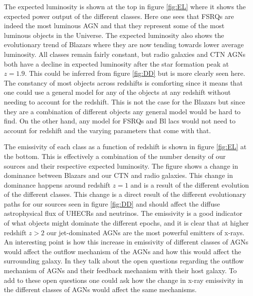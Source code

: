 The expected luminosity is shown at the top in figure \ref*{fig:EL} where it shows the expected power output of the different classes. Here one sees that FSRQs are indeed the most luminous AGN and 
that they represent some of the most luminous objects in the Universe.
The expected luminosity also shows the evolutionary trend of Blazars where they are now tending towards lower average luminosity. 
All classes remain fairly constant, but radio galaxies and CTN AGNs both have a decline in expected luminosity after the star formation peak at $z=1.9$. This could be inferred from figure \ref*{fig:DD} but is more clearly seen here.
The constancy of most objects across redshifts is comforting since it means that one could use a general model for any of the objects at any redshift without needing to account for the redshift. 
This is not the case for the Blazars but since they are a combination of different objects any general model would be hard to find. On the other hand, any model for FSRQs and Bl lacs would not need to account for redshift and the varying parameters that come with that. 

The emissivity of each class as a function of redshift is shown in figure \ref*{fig:EL} at the bottom. This is effectively a combination of the number density of our sources and their respective expected luminosity. 
The figure shows a change in dominance between Blazars and our CTN and radio galaxies. This change in dominance happens around redshift $z=1$ and is a result of the different evolution of the different classes.
This change is a direct result of the different evolutionary paths for our sources seen in figure \ref*{fig:DD} and should affect the diffuse astrophysical flux of UHECRs and neutrinos. 
The emissivity is a good indicator of what objects might dominate the different epochs, and it is clear that at higher redshift $z>2$ our jet-dominated AGNs are the most powerful emitters of x-rays. 
An interesting point is how this increase in emissivity of different classes of AGNs would affect the outflow mechanism of the AGNs and how this would affect the surrounding galaxy. In \cite{Laha_2021}
they talk about the open questions regarding the outflow mechanism of AGNs and their feedback mechanism with their host galaxy. To add to these open questions one could ask how the change in x-ray emissivity in the different classes of AGNs would affect the same mechanisms.


